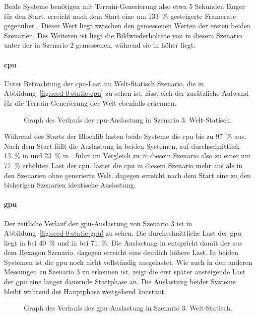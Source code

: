 Beide Systeme benötigen mit Terrain-Generierung also etwa 5 Sekunden länger für den Start. \sysB{} erreicht nach dem Start eine um \SI{133}{\percent} gesteigerte Framerate gegenüber \sysA{}. Dieser Wert liegt zwischen den gemessenen Werten der ersten beiden Szenarien. Des Weiteren ist liegt die Bildwiederholrate von \sysA{} in diesem Szenario unter der in Szenario 2 gemessenen, während sie in \sysB{} höher liegt.

\paragraph{\ac{cpu}}
Unter Betrachtung der \ac{cpu}-Last im Welt-Statisch Szenario, die in Abbildung~\vref{fig:seed-0-static-cpu} zu sehen ist, lässt sich der zusätzliche Aufwand für die Terrain-Generierung der Welt ebenfalls erkennen.
\begin{figure}[!htbp]
	\caption[Graph des Verlaufs der -Auslastung in Szenario 3: Welt-Statisch.]{Graph des Verlaufs der \ac{cpu}-Auslastung in Szenario 3: Welt-Statisch.}\label{fig:seed-0-static-cpu}
\end{figure}
Während des Starts der Blocklib lasten beide Systeme die \ac{cpu} bis zu \SI{97}{\percent} aus. Nach dem Start fällt die Auslastung in beiden Systemen, auf durchschnittlich \SI{13}{\percent} in \sysA{} und \SI{23}{\percent} in \sysB{}.
\sysB{} führt im Vergleich zu \sysA{} in diesem Szenario also zu einer um \SI{77}{\percent} erhöhten Last der \ac{cpu}. \sysB{} lastet die \ac{cpu} in diesem Szenario mehr aus als in den Szenarien ohne generierte Welt. \sysA{} dagegen erreicht nach dem Start eine zu den bisherigen Szenarien identische Auslastung.

\paragraph{\ac{gpu}}
Der zeitliche Verlauf der \ac{gpu}-Auslastung von Szenario 3 ist in Abbildung~\vref{fig:seed-0-static-gpu} zu sehen. Die durchschnittliche Last der \ac{gpu} liegt in \sysA{} bei \SI{40}{\percent} und in \sysB{} bei \SI{71}{\percent}. Die Auslastung in \sysA{} entspricht damit der aus dem Hexagon Szenario. \sysB{} dagegen erreicht eine deutlich höhere Last. In beiden Systemen ist die \ac{gpu} noch nicht vollständig ausgelastet. Wie auch in den anderen Messungen zu Szenario 3 zu erkennen ist, zeigt die erst später ansteigende Last der \ac{gpu} eine länger dauernde Startphase an. Die Auslastung beider Systeme bleibt während der Hauptphase weitgehend konstant.
\begin{figure}[!htbp]
	\caption[Graph des Verlaufs der -Auslastung in Szenario 3: Welt-Statisch.]{Graph des Verlaufs der \ac{gpu}-Auslastung in Szenario 3: Welt-Statisch.}\label{fig:seed-0-static-gpu}
\end{figure}

